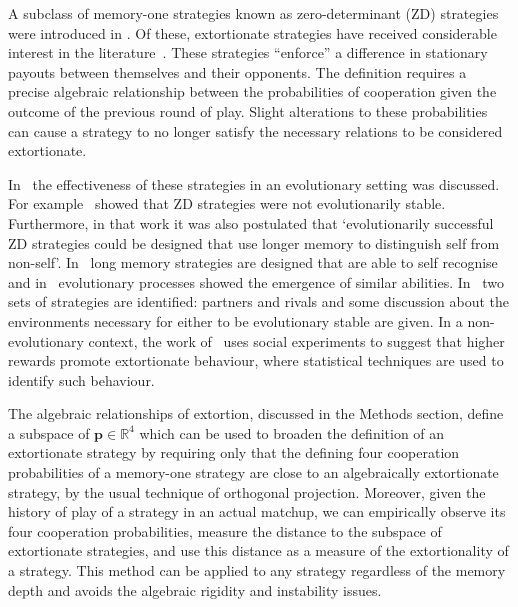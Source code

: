 \documentclass[10pt,letterpaper]{article}
\begin{document}
A subclass of memory-one strategies known as zero-determinant (ZD) strategies
were introduced in \cite{Press2012}. Of these, extortionate strategies have received
considerable interest in the literature~\cite{hilbe2015partners}. These
strategies ``enforce'' a difference in stationary payouts between themselves and
their opponents. The definition requires a precise algebraic relationship
between the probabilities of cooperation given the outcome of the previous round
of play. Slight alterations to these probabilities can cause a strategy to no
longer satisfy the necessary relations to be considered extortionate.

In~\cite{adami2013evolutionary, hilbe2018partners, Hilbe2013, hilbe2013adaptive,
hilbe2015partners, ichinose2018zero, Moran1707} the effectiveness of these
strategies in an evolutionary setting was discussed. For
example~\cite{adami2013evolutionary} showed that ZD strategies were not
evolutionarily stable. Furthermore, in that work it was also postulated that
`evolutionarily successful ZD strategies could be designed that use longer
memory to distinguish self from non-self'. In~\cite{lee2015art} long memory
strategies are designed that are able to self recognise and in~\cite{Moran1707}
evolutionary processes showed the emergence of similar abilities.
In~\cite{hilbe2018partners} two sets of strategies are identified: partners and
rivals and some discussion about the environments necessary for either to be
evolutionary stable are given. In a non-evolutionary context, the work of~\cite{becks2019extortion} uses social
experiments to suggest that higher rewards promote extortionate
behaviour, where statistical techniques are used to identify such behaviour.

The algebraic relationships of extortion, discussed in
the Methods section, define a subspace of
\(\textbf{p}\in\mathbb{R}^4\) which can be used to broaden the definition of an extortionate
strategy by requiring only that the defining four cooperation probabilities of a
memory-one strategy are close to an algebraically extortionate strategy, by the usual
technique of orthogonal projection. Moreover, given the history of play of a
strategy in an actual matchup, we can empirically observe its four
cooperation probabilities, measure the distance to the subspace of extortionate
strategies, and use this distance as a measure of the extortionality of a
strategy. This method can be applied to any strategy regardless of the memory
depth and avoids the algebraic rigidity and instability issues.
\end{document}
